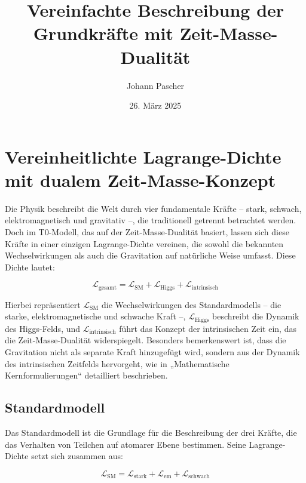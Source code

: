 \documentclass[a4paper,12pt]{article}
\title{Vereinfachte Beschreibung der Grundkräfte mit Zeit-Masse-Dualität}
\author{Johann Pascher}
\date{26. März 2025}
\begin{document}
	
	\maketitle
	
	\tableofcontents
	\newpage
	
	\section{Vereinheitlichte Lagrange-Dichte mit dualem Zeit-Masse-Konzept}
	
	Die Physik beschreibt die Welt durch vier fundamentale Kräfte – stark, schwach, elektromagnetisch und gravitativ –, die traditionell getrennt betrachtet werden. Doch im T0-Modell, das auf der Zeit-Masse-Dualität basiert, lassen sich diese Kräfte in einer einzigen Lagrange-Dichte vereinen, die sowohl die bekannten Wechselwirkungen als auch die Gravitation auf natürliche Weise umfasst. Diese Dichte lautet:
	
	\begin{equation}
		\mathcal{L}_\text{gesamt} = \mathcal{L}_\text{SM} + \mathcal{L}_\text{Higgs} + \mathcal{L}_\text{intrinsisch}
	\end{equation}
	
	Hierbei repräsentiert \(\mathcal{L}_\text{SM}\) die Wechselwirkungen des Standardmodells – die starke, elektromagnetische und schwache Kraft –, \(\mathcal{L}_\text{Higgs}\) beschreibt die Dynamik des Higgs-Felds, und \(\mathcal{L}_\text{intrinsisch}\) führt das Konzept der intrinsischen Zeit ein, das die Zeit-Masse-Dualität widerspiegelt. Besonders bemerkenswert ist, dass die Gravitation nicht als separate Kraft hinzugefügt wird, sondern aus der Dynamik des intrinsischen Zeitfelds hervorgeht, wie in „Mathematische Kernformulierungen“ \cite{pascher_lagrange_2025} detailliert beschrieben.
	
	\subsection{Standardmodell}
	
	Das Standardmodell ist die Grundlage für die Beschreibung der drei Kräfte, die das Verhalten von Teilchen auf atomarer Ebene bestimmen. Seine Lagrange-Dichte setzt sich zusammen aus:
	
	\begin{equation}
		\mathcal{L}_\text{SM} = \mathcal{L}_\text{stark} + \mathcal{L}_\text{em} + \mathcal{L}_\text{schwach}
	\end{equation}
	
\end{document}
